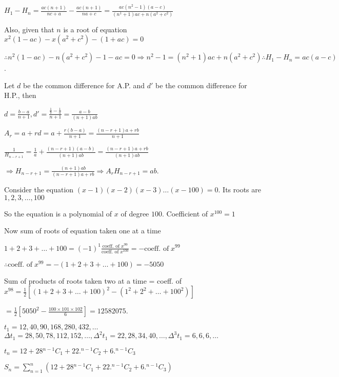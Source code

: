   $H_1 - H_n = \frac{ac(n + 1)}{nc + a} - \frac{ac(n + 1)}{na + c} = \frac{ac(n^2 - 1)(a - c)}{(n^1 + 1)ac +
    n(a^2 + c^2)}$

  Also, given that $n$ is a root of equation $x^2(1 - ac) - x(a^2+c^2) - (1 + ac) = 0$

  $\therefore n^2(1 - ac) - n(a^2 + c^2) - 1 - ac = 0 \Rightarrow n^2 - 1 = (n^2 + 1)ac + n(a^2 + c^2)
  \therefore H_1 - H_n = ac(a - c)$.
\item Let $d$ be the common difference for A.P. and $d'$ be the common difference for H.P., then

  $d = \frac{b - a}{n + 1}, d' = \frac{\frac{1}{b} - \frac{1}{a}}{n + 1} = \frac{a - b}{(n + 1)ab}$

  $A_r = a + rd = a + \frac{r(b - a)}{n + 1} = \frac{(n - r + 1)a + rb}{n + 1}$

  $\frac{1}{H_{n - r + 1}} = \frac{1}{a} + \frac{(n - r + 1)(a - b)}{(n + 1)ab} = \frac{(n - r + 1)a +
  rb}{(n + 1)ab}$

  $\Rightarrow H_{n - r + 1} = \frac{(n + 1)ab}{(n - r + 1)a + rb}\Rightarrow A_rH_{n - r + 1} = ab$.
\item Consider the equation $(x - 1)(x - 2)(x - 3)\ldots(x - 100) = 0.$ Its roots are $1, 2, 3, \ldots, 100$

  So the equation is a polynomial of $x$ of degree $100.$ Coefficient of $x^{100} = 1$

  Now sum of roots of equation taken one at a time

  $1 + 2 + 3 + \ldots + 100 = (-1)^1\frac{\text{coeff. of}\;x^{99}}{\text{coeff. of}\;x^{100}} = -\text{coeff. of}\;x^{99}$

  $\therefore \text{coeff. of}\;x^{99} = -(1 + 2 + 3 + \ldots + 100) = -5050$

  Sum of products of roots taken two at a time = coeff. of $x^{98} = \frac{1}{2}[(1 + 2 + 3 + \ldots + 100)^2 - (1^2 + 2^2 +
    \ldots + 100^2)]$

  $= \frac{1}{2}\left[5050^2 - \frac{100\times101\times102}{6}\right] = 12582075$.
\item $t_1 = 12, 40, 90, 168, 280, 432, \ldots$
  $\Delta t_1 = 28, 50, 78, 112, 152, \ldots, \Delta^2 t_1 = 22, 28, 34, 40, \ldots, \Delta^3 t_1 = 6, 6, 6,
  \ldots$

  $t_n = 12 + 28{}^{n - 1}C_1 + 22.{}^{n - 1}C_2 + 6.{}^{n - 1}C_3$

  $S_n = \displaystyle\sum_{n = 1}^n (12 + 28{}^{n - 1}C_1 + 22.{}^{n - 1}C_2 + 6.{}^{n - 1}C_3)$

